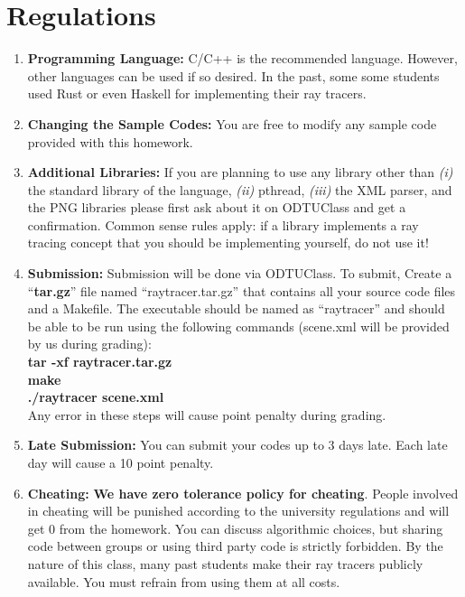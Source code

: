\documentclass[12pt]{article}
\begin{document}
\section{Regulations}

\begin{enumerate}

\item \textbf{Programming Language:} C/C++ is the recommended language.
However, other languages can be used if so desired. In the past, some
some students used Rust or even Haskell for implementing their ray
tracers.

\item \textbf{Changing the Sample Codes:} You are free to modify any
sample code provided with this homework.

\item \textbf{Additional Libraries:} If you are planning to use any
library other than \textit{(i)} the standard library of the language,
\textit{(ii)} pthread, \textit{(iii)} the XML parser, and the PNG
libraries please first ask about
it on ODTUClass and get a confirmation. Common sense rules apply: if a
library implements a ray tracing concept that you should be
implementing yourself, do not use it!

\item \textbf{Submission:} Submission will be done via ODTUClass. 
To submit, Create a
``\textbf{tar.gz}''  file  named  ``raytracer.tar.gz'' that
contains all your source code files and a Makefile. The
executable should  be  named as  ``raytracer'' and  should  be
able  to  be  run  using  the following commands (scene.xml
        will be provided by us during grading):\\

\indent \textbf{tar -xf raytracer.tar.gz}\\
\indent \textbf{make}\\
\indent \textbf{./raytracer scene.xml}\\

\noindent Any error in these steps will cause point penalty during
grading.

\item \textbf{Late Submission:} You can submit your codes up to 3 days
late. Each late day will cause a 10 point penalty.

\item \textbf{Cheating:} \textbf{We have zero tolerance policy
for cheating}.  People involved in cheating will be
punished according to the university regulations and will
get 0 from the homework. You can discuss algorithmic choices,
but sharing code between groups or using third party code
is strictly forbidden. By the nature of this class, many past students
make their ray tracers publicly available. You must refrain from using
them at all costs.


\end{enumerate}
\end{document}
